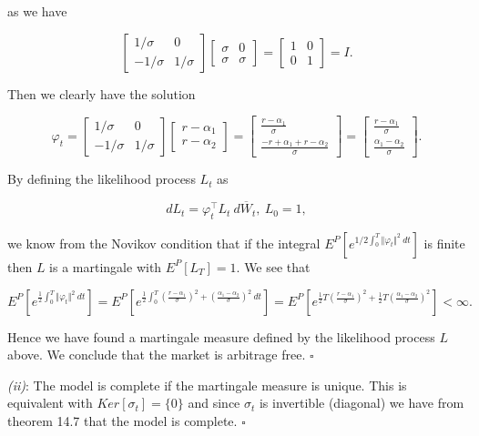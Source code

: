 \documentclass[
]{book}
\begin{document}
as we have

\[
\begin{bmatrix}
1/\sigma & 0\\
-1/\sigma & 1/\sigma
\end{bmatrix}
\begin{bmatrix}
\sigma & 0\\
\sigma & \sigma
\end{bmatrix}=
\begin{bmatrix}
1 & 0\\
0 & 1
\end{bmatrix}=I.
\]

Then we clearly have the solution

\[
\varphi_t=
\begin{bmatrix}
1/\sigma & 0\\
-1/\sigma & 1/\sigma
\end{bmatrix}\begin{bmatrix}
r-\alpha_1\\
r-\alpha_2
\end{bmatrix}=
\begin{bmatrix}
\frac{r-\alpha_1}{\sigma}\\
\frac{-r+\alpha_1+r-\alpha_2}{\sigma}
\end{bmatrix}=\begin{bmatrix}
\frac{r-\alpha_1}{\sigma}\\
\frac{\alpha_1-\alpha_2}{\sigma}
\end{bmatrix}.
\]

By defining the likelihood process \(L_t\) as

\[
dL_t=\varphi_t^\top L_t\ d\overline{W}_t,\ L_0=1,
\]

we know from the Novikov condition that if the integral \(E^P[e^{1/2\int_0^T\Vert \varphi_t\Vert^2\ dt}]\) is finite then \(L\) is a martingale with \(E^P[L_T]=1\). We see that

\[
E^P\left[e^{\frac{1}{2}\int_0^T\Vert \varphi_t\Vert^2\ dt}\right]=E^P\left[e^{\frac{1}{2}\int_0^T \left(\frac{r-\alpha_1}{\sigma}\right)^2+\left(\frac{\alpha_1-\alpha_2}{\sigma}\right)^2\ dt}\right]=E^P\left[e^{\frac{1}{2}T \left(\frac{r-\alpha_1}{\sigma}\right)^2+\frac{1}{2}T\left(\frac{\alpha_1-\alpha_2}{\sigma}\right)^2}\right]<\infty.
\]

Hence we have found a martingale measure defined by the likelihood process \(L\) above. We conclude that the market is arbitrage free. \(\square\)

\emph{(ii)}: The model is complete if the martingale measure is unique. This is equivalent with \(Ker[\sigma_t]=\{0\}\) and since \(\sigma_t\) is invertible (diagonal) we have from theorem 14.7 that the model is complete. \(\square\)
\end{document}
